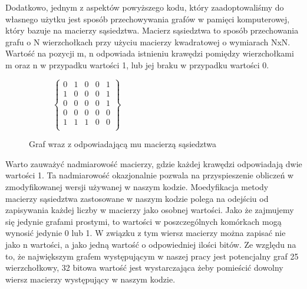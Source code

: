 \documentclass[11pt]{article}
\begin{document}
Dodatkowo, jednym z aspektów powyższego kodu, który zaadoptowaliśmy do własnego użytku jest sposób przechowywania grafów w pamięci komputerowej, który bazuje na macierzy sąsiedztwa. Macierz sąsiedztwa to sposób przechowania grafu o N wierzchołkach przy użyciu macierzy kwadratowej o wymiarach NxN. Wartość na pozycji m, n odpowiada istnieniu krawędzi pomiędzy wierzchołkami m oraz n w przypadku wartości 1, lub jej braku w przypadku wartości 0.
\begin{figure}[h]
\begin{subfigure}{0.5\textwidth}
  \end{subfigure}
  \begin{subfigure}{0.5\textwidth}
$\begin{Bmatrix}
	0 & 1 & 0 & 0 & 1 \\
	1 & 0 & 0 & 0 & 1 \\
	0 & 0 & 0 & 0 & 1 \\
	0 & 0 & 0 & 0 & 0 \\
	1 & 1 & 1 & 0 & 0 \\
	\end{Bmatrix}$
	
	\end{subfigure}
	\caption{Graf wraz z odpowiadającą mu macierzą sąsiedztwa}
\end{figure}

Warto zauważyć nadmiarowość macierzy, gdzie każdej krawędzi odpowiadają dwie wartości 1. Ta nadmiarowość okazjonalnie pozwala na przyspieszenie obliczeń w zmodyfikowanej wersji używanej w naszym kodzie.
Moedyfikacja metody macierzy sąsiedztwa zastosowane w naszym kodzie polega na odejściu od zapisywania każdej liczby w macierzy jako osobnej wartości. Jako że zajmujemy się jedynie grafami prostymi, to wartości w poszczególnych komórkach mogą wynosić jedynie 0 lub 1. W związku z tym wiersz macierzy można zapisać nie jako n wartości, a jako jedną wartość o odpowiedniej ilości bitów. Ze względu na to, że największym grafem występującym w naszej pracy jest potencjalny graf 25 wierzchołkowy, 32 bitowa wartość jest wystarczająca żeby pomieścić dowolny wiersz macierzy występujący w naszym kodzie. 
 
\end{document}
